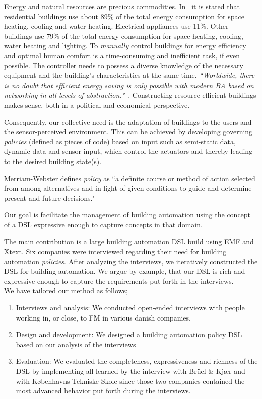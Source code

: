 Energy and natural resources are precious commodities. In~\cite{janssen2004towards} it is stated that residential buildings use about 89\% of the total energy consumption for space heating, cooling and water heating. Electrical appliances use 11\%. Other buildings use 79\% of the total energy consumption for space heating, cooling, water heating and lighting. To \textit{manually} control buildings for energy efficiency and optimal human comfort is a time-consuming and inefficient task, if even possible. The controller needs to possess a diverse knowledge of the necessary equipment and the building's characteristics at the same time. \textit{``Worldwide, there is no doubt that efficient energy saving is only possible with modern BA based on networking in all levels of abstraction."}~\cite{dietrich2010communication}. Constructing resource efficient buildings makes sense, both in a political and economical perspective. 

Consequently, our collective need is the adaptation of buildings to the users and the sensor-perceived environment. This can be achieved by developing governing \textit{policies} (defined as pieces of code) based on input such as semi-static data, dynamic data and sensor input, which control the actuators and thereby leading to the desired building state(s).

Merriam-Webster defines \textit{policy} as ``a definite course or method of action selected from among alternatives and in light of given conditions to guide and determine present and future decisions."

Our goal is facilitate the management of building automation using the concept of a DSL expressive enough to capture concepts in that domain.

The main contribution is a large building automation DSL build using EMF and Xtext. Six companies were interviewed regarding their need for building automation \textit{policies}. After analyzing the interviews, we iteratively constructed the DSL for building automation. We argue by example, that our DSL is rich and expressive enough to capture the requirements put forth in the interviews. 
\newline\\
We have tailored our method as follows;

\begin{enumerate}
	\item Interviews and analysis: We conducted open-ended interviews with people working in, or close, to FM in various danish companies.
	\item Design and development: We designed a building automation policy DSL based on our analysis of the interviews
	\item Evaluation: We evaluated the completeness, expressiveness and richness of the DSL by implementing all learned by the interview with Br\"{u}el \& Kj\ae r and with K\o benhavns Tekniske Skole since those two companies contained the most advanced behavior put forth during the interviews.
\end{enumerate}

